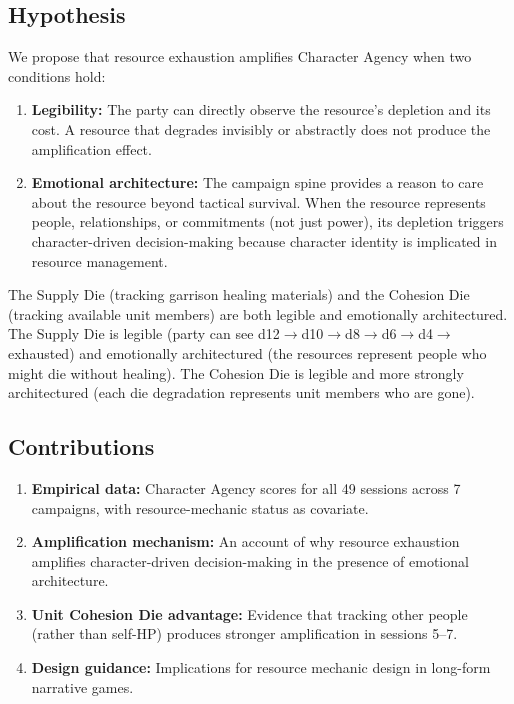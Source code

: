 \subsection{Hypothesis}

We propose that resource exhaustion amplifies Character Agency when two conditions hold:

\begin{enumerate}
  \item \textbf{Legibility:} The party can directly observe the resource's depletion
    and its cost. A resource that degrades invisibly or abstractly does not produce
    the amplification effect.
  \item \textbf{Emotional architecture:} The campaign spine provides a reason to care
    about the resource beyond tactical survival. When the resource represents people,
    relationships, or commitments (not just power), its depletion triggers character-driven
    decision-making because character identity is implicated in resource management.
\end{enumerate}

The Supply Die (tracking garrison healing materials) and the Cohesion Die (tracking
available unit members) are both legible and emotionally architectured. The Supply Die
is legible (party can see d12$\to$d10$\to$d8$\to$d6$\to$d4$\to$exhausted) and emotionally
architectured (the resources represent people who might die without healing). The
Cohesion Die is legible and more strongly architectured (each die degradation represents
unit members who are gone).

\subsection{Contributions}

\begin{enumerate}
  \item \textbf{Empirical data:} Character Agency scores for all 49 sessions across 7
    campaigns, with resource-mechanic status as covariate.
  \item \textbf{Amplification mechanism:} An account of why resource exhaustion amplifies
    character-driven decision-making in the presence of emotional architecture.
  \item \textbf{Unit Cohesion Die advantage:} Evidence that tracking other people (rather
    than self-HP) produces stronger amplification in sessions 5--7.
  \item \textbf{Design guidance:} Implications for resource mechanic design in long-form
    narrative games.
\end{enumerate}
